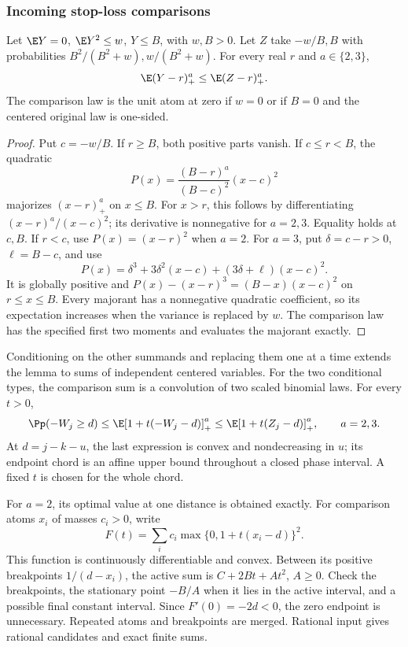 \subsubsection{Incoming stop-loss comparisons}

\begin{lemma}
\label{ms:finite:countcore:stoploss}
Let \(\E Y=0\), \(\E Y^2\le w\), \(Y\le B\), with
\(w,B>0\). Let \(Z\) take \(-w/B,B\) with probabilities
\(B^2/(B^2+w),w/(B^2+w)\). For every real \(r\) and
\(a\in\{2,3\}\),
\[
 \E(Y-r)_+^a\le\E(Z-r)_+^a.
\]
The comparison law is the unit atom at zero if \(w=0\) or if
\(B=0\) and the centered original law is one-sided.
\end{lemma}
\begin{proof}
Put \(c=-w/B\). If \(r\ge B\), both positive parts vanish.
If \(c\le r<B\), the quadratic
\[
 P(x)=\frac{(B-r)^a}{(B-c)^2}(x-c)^2
\]
majorizes \((x-r)_+^a\) on \(x\le B\). For \(x>r\), this
follows by differentiating \((x-r)^a/(x-c)^2\); its derivative is
nonnegative for \(a=2,3\). Equality holds at \(c,B\).
If \(r<c\), use \(P(x)=(x-r)^2\) when \(a=2\). For \(a=3\),
put \(\delta=c-r>0\), \(\ell=B-c\), and use
\[
 P(x)=\delta^3+3\delta^2(x-c)+(3\delta+\ell)(x-c)^2.
\]
It is globally positive and
\(P(x)-(x-r)^3=(B-x)(x-c)^2\) on \(r\le x\le B\).
Every majorant has a nonnegative quadratic coefficient, so its
expectation increases when the variance is replaced by \(w\).
The comparison law has the specified first two moments and evaluates
the majorant exactly.
\end{proof}

Conditioning on the other summands and replacing them one at a time
extends the lemma to sums of independent centered variables. For the two
conditional types, the comparison sum is a convolution of two scaled
binomial laws. For every \(t>0\),
\begin{equation}
 \Pp(-W_j\ge d)
 \le\E[1+t(-W_j-d)]_+^a
 \le\E[1+t(Z_j-d)]_+^a,
 \qquad a=2,3.
 \label{ms:finite:countcore:stoplosstail}
\end{equation}
At \(d=j-k-u\), the last expression is convex and nondecreasing
in \(u\); its endpoint chord is an affine upper bound throughout a
closed phase interval. A fixed \(t\) is chosen for the whole chord.

For \(a=2\), its optimal value at one distance is obtained exactly.
For comparison atoms \(x_i\) of masses \(c_i>0\), write
\[
 F(t)=\sum_i c_i\max\{0,1+t(x_i-d)\}^2.
\]
This function is continuously differentiable and convex. Between its
positive breakpoints \(1/(d-x_i)\), the active sum is
\(C+2Bt+At^2\), \(A\ge0\). Check the breakpoints, the stationary
point \(-B/A\) when it lies in the active interval, and a possible
final constant interval. Since \(F'(0)=-2d<0\), the zero endpoint
is unnecessary. Repeated atoms and breakpoints are merged. Rational
input gives rational candidates and exact finite sums.

